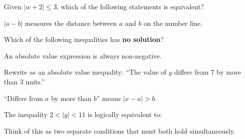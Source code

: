 \documentclass{ximera}
\begin{document}
\begin{problem}
Given $|w+2| \leq 3$, which of the following statements is equivalent?
\begin{hint}
$|a - b|$ measures the distance between $a$ and $b$ on the number line.
\end{hint}
\begin{multipleChoice}
\end{multipleChoice}
\end{problem}

\begin{problem}
Which of the following inequalities has \textbf{no solution}?
\begin{hint}
An absolute value expression is always non-negative.
\end{hint}
\begin{multipleChoice}
\end{multipleChoice}
\end{problem}

\begin{problem}
Rewrite as an absolute value inequality: ``The value of $y$ differs from $7$ by more than $3$ units.''
\begin{hint}
``Differs from $a$ by more than $b$'' means $|x - a| > b$.
\end{hint}
\begin{multipleChoice}
\end{multipleChoice}
\end{problem}

\begin{problem}
The inequality $2 < |y| < 11$ is logically equivalent to:
\begin{hint}
Think of this as two separate conditions that must both hold simultaneously.
\end{hint}
\begin{multipleChoice}
\end{multipleChoice}
\end{problem}
\end{document}
